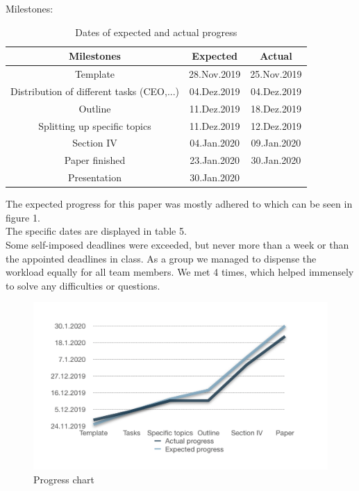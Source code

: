Milestones:
\begin{table}[H]
\caption{Dates of expected and actual progress}
\centering
\begin{tabular}{ccc}
\toprule
Milestones & Expected & Actual\\
\midrule
Template & 28.Nov.2019 & 25.Nov.2019\\
Distribution of different tasks (CEO,...) & 04.Dez.2019 &04.Dez.2019\\
Outline & 11.Dez.2019& 18.Dez.2019\\
Splitting up specific topics & 11.Dez.2019&12.Dez.2019\\
Section IV & 04.Jan.2020&09.Jan.2020\\
Paper finished& 23.Jan.2020& 30.Jan.2020\\
Presentation & 30.Jan.2020& \\
\bottomrule
\end{tabular}
\end{table}
The expected progress for this paper was mostly adhered to which can be seen in figure 1. \\
The specific dates are displayed in table 5.\\
Some self-imposed deadlines were exceeded, but never more than a week or than the appointed deadlines in class. As a group we managed to dispense the workload equally for all team members. We met 4 times, which helped immensely to solve any difficulties or questions. 

\begin{figure}[H]
\centering
\includegraphics[scale=0.5]{Progress_chart}
\caption{Progress chart}
\end{figure}

